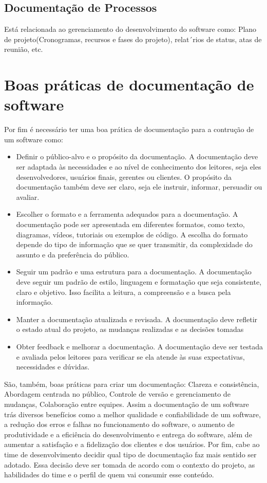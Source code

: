 \documentclass[12pt,oneside,a4paper,article]{abntex2}
\begin{document}
\subsection{Documentação de Processos}
Está relacionada ao gerenciamento do desenvolvimento do software como: Plano de projeto(Cronogramas, recursos e fases do projeto), relat´rios de status, atas de reunião, etc.

\section{Boas práticas de documentação de software}
Por fim é necessário ter uma boa prática de documentação para a contrução de um software como:


\begin{itemize}
      \item Definir o público-alvo e o propósito da documentação. A documentação deve ser adaptada às
            necessidades e ao nível de conhecimento dos leitores, seja eles desenvolvedores, usuários finais,
            gerentes ou clientes. O propósito da documentação também deve ser claro, seja ele instruir,
            informar, persuadir ou avaliar.
      \item Escolher o formato e a ferramenta adequados para a documentação. A documentação pode ser
            apresentada em diferentes formatos, como texto, diagramas, vídeos, tutoriais ou exemplos de
            código. A escolha do formato depende do tipo de informação que se quer transmitir, da
            complexidade do assunto e da preferência do público.
      \item Seguir um padrão e uma estrutura para a documentação. A documentação deve seguir um padrão
            de estilo, linguagem e formatação que seja consistente, claro e objetivo. Isso facilita a leitura, a
            compreensão e a busca pela informação.
      \item Manter a documentação atualizada e revisada. A documentação deve refletir o estado atual do
            projeto, as mudanças realizadas e as decisões tomadas
      \item Obter feedback e melhorar a documentação. A documentação deve ser testada e avaliada pelos
            leitores para verificar se ela atende às suas expectativas, necessidades e dúvidas.

\end{itemize}
São, também, boas práticas para criar um documentação: Clareza e consistência, Abordagem centrada no público, Controle de versão e gerenciamento de mudanças, Colaboração entre equipes.
Assim a documentação de um software trás diversos benefícios como a melhor qualidade e confiabilidade de um software, a redução dos erros e falhas no funcionamento do software, o aumento de produtividade e a eficiência do desenvolvimento e entrega do software, além de aumentar a satisfação e a fidelização dos clientes e dos usuários. Por fim, cabe ao time de desenvolvimento decidir qual tipo de documentação faz mais sentido ser adotado. Essa decisão deve ser tomada de acordo com o contexto do projeto, as habilidades do time e o perfil de quem vai
consumir esse conteúdo.
\end{document}
